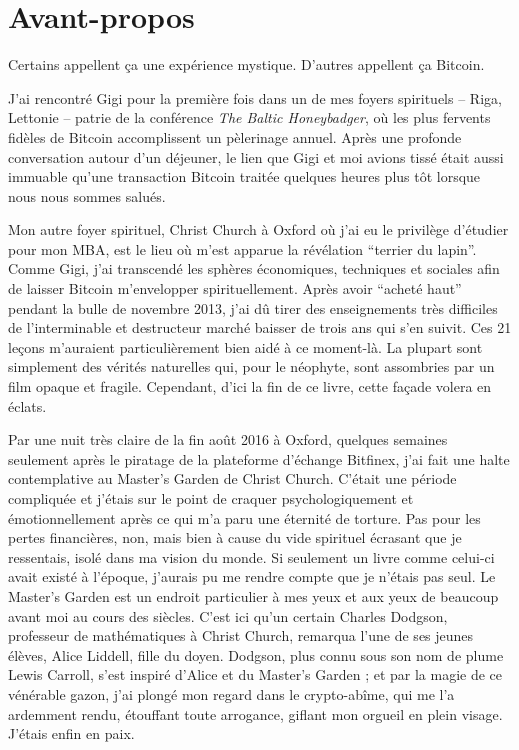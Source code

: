 \chapter*{Avant-propos}

Certains appellent ça une expérience mystique. D'autres appellent ça Bitcoin.

J'ai rencontré Gigi pour la première fois dans un de mes foyers spirituels --
Riga, Lettonie -- patrie de la conférence \textit{The Baltic Honeybadger}, où
les plus fervents fidèles de Bitcoin accomplissent un pèlerinage annuel. Après
une profonde conversation autour d'un déjeuner, le lien que Gigi et moi avions
tissé était aussi immuable qu'une transaction Bitcoin traitée quelques heures
plus tôt lorsque nous nous sommes salués.

Mon autre foyer spirituel, Christ Church à Oxford où j'ai eu le privilège
d'étudier pour mon MBA, est le lieu où m'est apparue la révélation
\enquote{terrier du lapin}. Comme Gigi, j'ai transcendé les sphères économiques,
techniques et sociales afin de laisser Bitcoin m'envelopper spirituellement.
Après avoir \enquote{acheté haut} pendant la bulle de novembre 2013, j'ai dû
tirer des enseignements très difficiles de l'interminable et destructeur marché
baisser de trois ans qui s'en suivit. Ces 21 leçons m'auraient particulièrement
bien aidé à ce moment-là. La plupart sont simplement des vérités naturelles qui,
pour le néophyte, sont assombries par un film opaque et fragile. Cependant,
d'ici la fin de ce livre, cette façade volera en éclats.

Par une nuit très claire de la fin août 2016 à Oxford, quelques semaines
seulement après le piratage de la plateforme d'échange Bitfinex, j'ai fait une
halte contemplative au Master's Garden de Christ Church. C'était une période
compliquée et j'étais sur le point de craquer psychologiquement et
émotionnellement après ce qui m'a paru une éternité de torture. Pas pour les
pertes financières, non, mais bien à cause du vide spirituel écrasant que je
ressentais, isolé dans ma vision du monde. Si seulement un livre comme celui-ci
avait existé à l'époque, j'aurais pu me rendre compte que je n'étais pas seul.
Le Master’s Garden est un endroit particulier à mes yeux et aux yeux de beaucoup
avant moi au cours des siècles. C'est ici qu'un certain Charles Dodgson,
professeur de mathématiques à Christ Church, remarqua l'une de ses jeunes
élèves, Alice Liddell, fille du doyen. Dodgson, plus connu sous son nom de plume
Lewis Carroll, s'est inspiré d'Alice et du Master's Garden ; et par la magie de
ce vénérable gazon, j'ai plongé mon regard dans le crypto-abîme, qui me l'a
ardemment rendu, étouffant toute arrogance, giflant mon orgueil en plein visage.
J'étais enfin en paix.

